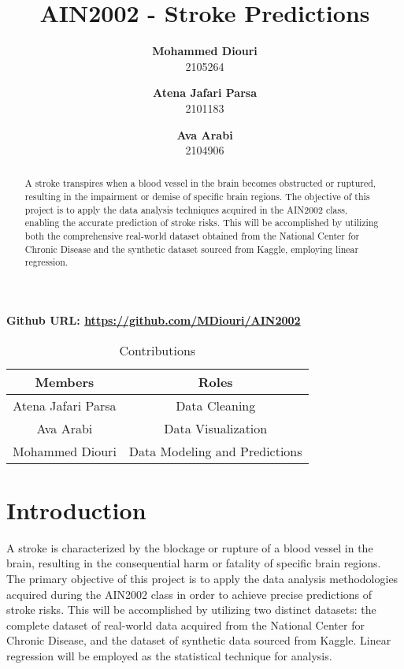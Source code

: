 \documentclass{article}
\title{AIN2002 - Stroke Predictions}
\author{
  \textbf{Mohammed Diouri}\\
  2105264
  \and
  \textbf{Atena Jafari Parsa}\\
  2101183
  \and
  \textbf{Ava Arabi}\\
  2104906
}
\begin{document}
\maketitle
\textbf{Github URL: \url{https://github.com/MDiouri/AIN2002}}

\begin{table}[htbp]
  \centering
  \caption{Contributions}
  \label{tab:mytable}
  \begin{tabular}{|c|c|}
    \hline
    \textbf{Members} & \textbf{Roles} \\
    \hline
    Atena Jafari Parsa & Data Cleaning\\
    \hline
    Ava Arabi & Data Visualization\\
    \hline
    Mohammed Diouri & Data Modeling and Predictions\\
    \hline
  \end{tabular}
\end{table}

\begin{abstract}
  A stroke transpires when a blood vessel in the brain becomes obstructed or ruptured, resulting in the impairment or demise of specific brain regions. The objective of this project is to apply the data analysis techniques acquired in the AIN2002 class, enabling the accurate prediction of stroke risks. This will be accomplished by utilizing both the comprehensive real-world dataset obtained from the National Center for Chronic Disease and the synthetic dataset sourced from Kaggle, employing linear regression.
\end{abstract}

\section{Introduction}
A stroke is characterized by the blockage or rupture of a blood vessel in the brain, resulting in the consequential harm or fatality of specific brain regions. The primary objective of this project is to apply the data analysis methodologies acquired during the AIN2002 class in order to achieve precise predictions of stroke risks. This will be accomplished by utilizing two distinct datasets: the complete dataset of real-world data acquired from the National Center for Chronic Disease, and the dataset of synthetic data sourced from Kaggle. Linear regression will be employed as the statistical technique for analysis.
\end{document}
